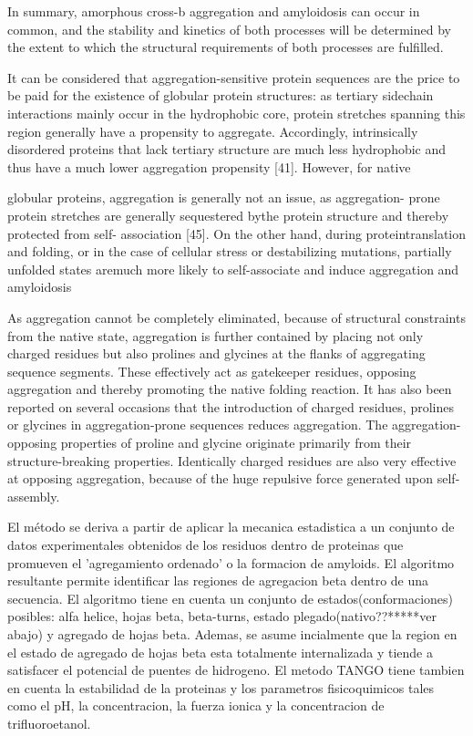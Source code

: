 In summary, amorphous cross-b aggregation and amyloidosis can occur in common, and the stability and kinetics of both processes will be determined by the extent to which the structural requirements of both processes are fulfilled.


It can be considered that aggregation-sensitive protein sequences are the price to be paid for the existence of globular protein structures: as tertiary sidechain interactions mainly occur in the hydrophobic core, protein stretches spanning this region generally have a propensity to aggregate. Accordingly, intrinsically disordered proteins that lack tertiary structure are much less hydrophobic and thus have a much lower aggregation propensity [41]. However, for native 

globular proteins, aggregation is generally not an issue, as aggregation- prone protein stretches are generally sequestered bythe protein structure and thereby protected from self-
association [45]. On the other hand, during proteintranslation and folding, or in the case of cellular stress or destabilizing mutations, partially unfolded states aremuch more likely to self-associate and induce aggregation and amyloidosis



As aggregation cannot be completely eliminated, because of structural constraints from the native state, aggregation is further contained by placing not only charged residues but also prolines and glycines at the flanks of aggregating sequence segments. These effectively act as gatekeeper residues, opposing aggregation and thereby promoting the native folding reaction. It has also been reported on several occasions that the introduction of charged residues, prolines or glycines in aggregation-prone sequences reduces aggregation.
The aggregation-opposing properties of proline and glycine originate primarily from their
structure-breaking properties. Identically charged residues are also very effective at opposing aggregation, because of the huge repulsive force generated upon self-assembly.


El método se deriva a partir de aplicar la mecanica estadistica a un conjunto de datos experimentales obtenidos de los residuos dentro de proteinas que promueven el 'agregamiento ordenado' o la formacion de amyloids. El algoritmo resultante permite identificar las regiones de agregacion beta dentro de una secuencia.
El algoritmo tiene en cuenta un conjunto de estados(conformaciones) posibles: alfa helice, hojas beta, beta-turns, estado plegado(nativo??*****ver abajo) y agregado de hojas beta. Ademas, se asume incialmente que la region en el estado de agregado de hojas beta esta totalmente internalizada y tiende a satisfacer el potencial de puentes de hidrogeno. 
El metodo TANGO tiene tambien en cuenta la estabilidad de la proteinas y los parametros fisicoquimicos tales como el pH, la concentracion, la fuerza ionica y la concentracion de trifluoroetanol.

